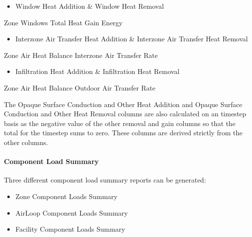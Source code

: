 \begin{itemize}
\tightlist
\item
  Window Heat Addition \& Window Heat Removal
\end{itemize}

Zone Windows Total Heat Gain Energy

\begin{itemize}
\tightlist
\item
  Interzone Air Transfer Heat Addition \& Interzone Air Transfer Heat Removal
\end{itemize}

Zone Air Heat Balance Interzone Air Transfer Rate

\begin{itemize}
\tightlist
\item
  Infiltration Heat Addition \& Infiltration Heat Removal
\end{itemize}

Zone Air Heat Balance Outdoor Air Transfer Rate

The Opaque Surface Conduction and Other Heat Addition and Opaque Surface Conduction and Other Heat Removal columns are also calculated on an timestep basis as the negative value of the other removal and gain columns so that the total for the timestep sums to zero. These columns are derived strictly from the other columns.

\paragraph{Component Load Summary}\label{component-load-summary}

Three different component load summary reports can be generated:

\begin{itemize}
\tightlist
\item
  Zone Component Loads Summary
\item
  AirLoop Component Loads Summary
\item
  Facility Component Loads Summary
\end{itemize}

